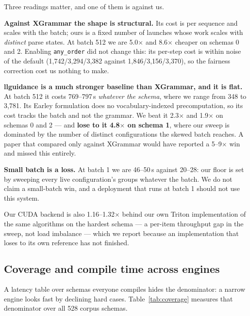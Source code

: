 \documentclass{article}
\begin{document}
Three readings matter, and one of them is against us.

\textbf{Against XGrammar the shape is structural.} Its cost is per sequence and
scales with the batch; ours is a fixed number of launches whose work scales
with \emph{distinct} parse states. At batch 512 we are 5.0$\times$ and
8.6$\times$ cheaper on schemas 0 and 2. Enabling \texttt{any\_order} did not
change this: its per-step cost is within noise of the default
(1{,}742/3{,}294/3{,}382 against 1{,}846/3{,}156/3{,}370), so the fairness
correction cost us nothing to make.

\textbf{llguidance is a much stronger baseline than XGrammar, and it is flat.}
At batch 512 it costs 769--797\,\textmu{}s \emph{whatever the schema}, where we
range from 348 to 3{,}781. Its Earley formulation does no vocabulary-indexed
precomputation, so its cost tracks the batch and not the grammar. We beat it
2.3$\times$ and 1.9$\times$ on schemas 0 and 2 --- and \textbf{lose to it
4.8$\times$ on schema 1}, where our sweep is dominated by the number of
distinct configurations the skewed batch reaches. A paper that compared only
against XGrammar would have reported a 5--9$\times$ win and missed this
entirely.

\textbf{Small batch is a loss.} At batch 1 we are 46--50\,\textmu{}s against
20--28: our floor is set by sweeping every live configuration's groups whatever
the batch. We do not claim a small-batch win, and a deployment that runs at
batch 1 should not use this system.

Our CUDA backend is also 1.16--1.32$\times$ behind our own Triton
implementation of the same algorithms on the hardest schema --- a per-item
throughput gap in the sweep, not load imbalance --- which we report because an
implementation that loses to its own reference has not finished.

\subsection{Coverage and compile time across engines}
\label{sec:eval-coverage}

A latency table over schemas everyone compiles hides the denominator: a narrow
engine looks fast by declining hard cases. Table~\ref{tab:coverage} measures
that denominator over all 528 corpus schemas.
\end{document}
